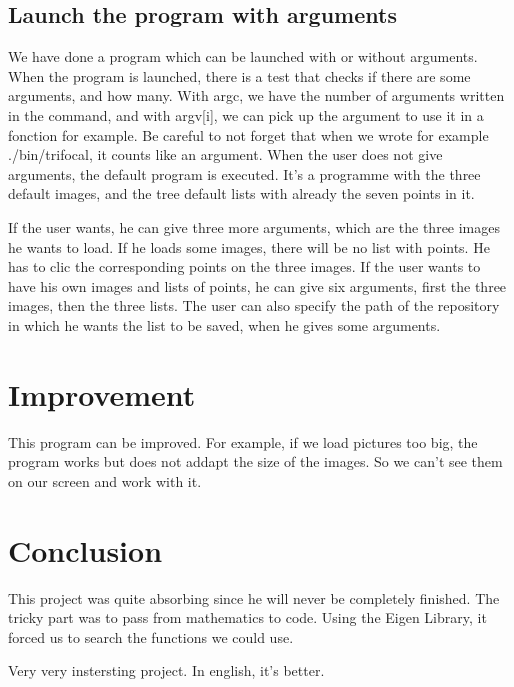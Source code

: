 \documentclass{report}
\begin{document}
\subsection{Launch the program with arguments}
We have done a program which can be launched with or without arguments. When the program is launched, there is a test that checks if there are some arguments, and how many. With argc, we have the number of arguments written in the command, and with argv[i], we can pick up the argument to use it in a fonction for example.
Be careful to not forget that when we wrote for example ./bin/trifocal, it counts like an argument.
When the user does not give arguments, the default program is executed. It's a programme with the three default images, and the tree default lists with already the seven points in it.


If the user wants, he can give three more arguments, which are the three images he wants to load. If he loads some images, there will be no list with points. He has to clic the corresponding points on the three images. 
If the user wants to have his own images and lists of points, he can give six arguments, first the three images, then the three lists. 
The user can also specify the path of the repository in which he wants the list to be saved, when he gives some arguments. 

\section{Improvement}
This program can be improved. For example, if we load pictures too big, the program works but does not addapt the size of the images. So we can't see them on our screen and work with it. 

\newpage
\section{Conclusion}
This project was quite absorbing since he will never be completely finished. The tricky part was to pass from mathematics to code. Using the Eigen Library, it forced us to search the functions we could use. 

Very very instersting project. In english, it's better. 
\end{document}
